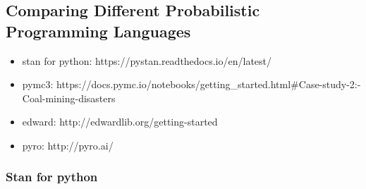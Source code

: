 \documentclass{article}
\begin{document}
\subsection{Comparing Different Probabilistic Programming Languages}

\begin{itemize}
	\item stan for python: https://pystan.readthedocs.io/en/latest/
	\item pymc3: https://docs.pymc.io/notebooks/getting\_started.html\#Case-study-2:-Coal-mining-disasters
	\item edward: http://edwardlib.org/getting-started
	\item pyro: http://pyro.ai/
\end{itemize}

\subsubsection{Stan for python}
\end{document}
